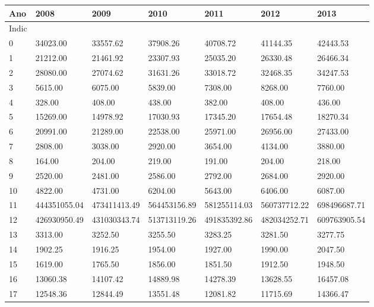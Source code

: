 \documentclass{report}
\begin{document}
\begin{tabular}{lllllll}
\toprule
Ano &          2008 &          2009 &          2010 &          2011 &          2012 &          2013 \\
\midrule
Indic &               &               &               &               &               &               \\
0         &  34023.00 &  33557.62 &  37908.26 &  40708.72 &  41144.35 &  42443.53 \\
1         &  21212.00 &  21461.92 &  23307.93 &  25035.20 &  26330.48 &  26466.34 \\
2         &  28080.00 &  27074.62 &  31631.26 &  33018.72 &  32468.35 &  34247.53 \\
3         &  5615.00 &  6075.00 &  5839.00 &  7308.00 &  8268.00 &  7760.00 \\
4         &  328.00 &  408.00 &  438.00 &  382.00 &  408.00 &  436.00 \\
5         &  15269.00 &  14978.92 &  17030.93 &  17345.20 &  17654.48 &  18270.34 \\
6         &  20991.00 &  21289.00 &  22538.00 &  25971.00 &  26956.00 &  27433.00 \\
7         &  2808.00 &  3038.00 &  2920.00 &  3654.00 &  4134.00 &  3880.00 \\
8         &  164.00 &  204.00 &  219.00 &  191.00 &  204.00 &  218.00 \\
9         &  2520.00 &  2481.00 &  2586.00 &  2792.00 &  2684.00 &  2920.00 \\
10        &  4822.00 &  4731.00 &  6204.00 &  5643.00 &  6406.00 &  6087.00 \\
11        &  444351055.04 &  473411413.49 &  564453156.89 &  581255114.03 &  560737712.22 &  698496687.71 \\
12        &  426930950.49 &  431030343.74 &  513713119.26 &  491835392.86 &  482034252.71 &  609763905.54 \\
13        &  3313.00 &  3252.50 &  3255.50 &  3283.25 &  3281.50 &  3277.75 \\
14        &  1902.25 &  1916.25 &  1954.00 &  1927.00 &  1990.00 &  2047.50 \\
15        &  1619.00 &  1765.50 &  1856.00 &  1851.50 &  1912.50 &  1948.50 \\
16        &  13060.38 &  14107.42 &  14889.98 &  14278.39 &  13628.55 &  16457.08 \\
17        &  12548.36 &  12844.49 &  13551.48 &  12081.82 &  11715.69 &  14366.47 \\

\end{tabular}
\end{document}

